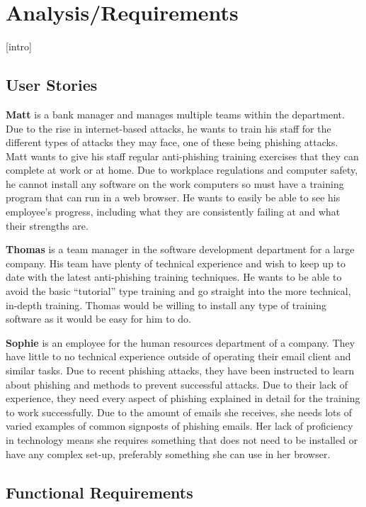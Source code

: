 \documentclass{l4proj}
\begin{document}
\chapter{Analysis/Requirements}
[intro]

\section{User Stories}
\textbf{Matt} is a bank manager and manages multiple teams within the department. Due to the rise in internet-based attacks, he wants to train his staff for the different types of attacks they may face, one of these being phishing attacks. Matt wants to give his staff regular anti-phishing training exercises that they can complete at work or at home. Due to workplace regulations and computer safety, he cannot install any software on the work computers so must have a training program that can run in a web browser. He wants to easily be able to see his employee's progress, including what they are consistently failing at and what their strengths are. 

\textbf{Thomas} is a team manager in the software development department for a large company. His team have plenty of technical experience and wish to keep up to date with the latest anti-phishing training techniques. He wants to be able to avoid the basic “tutorial” type training and go straight into the more technical, in-depth training. Thomas would be willing to install any type of training software as it would be easy for him to do. 

\textbf{Sophie} is an employee for the human resources department of a company. They have little to no technical experience outside of operating their email client and similar tasks. Due to recent phishing attacks, they have been instructed to learn about phishing and methods to prevent successful attacks. Due to their lack of experience, they need every aspect of phishing explained in detail for the training to work successfully. Due to the amount of emails she receives, she needs lots of varied examples of common signposts of phishing emails. Her lack of proficiency in technology means she requires something that does not need to be installed or have any complex set-up, preferably something she can use in her browser.

\section{Functional Requirements}
\end{document}
